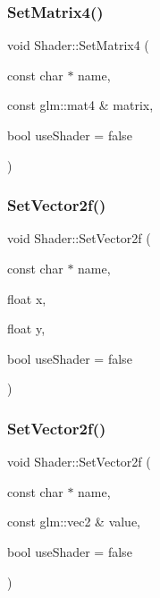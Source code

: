 \mbox{\label{classShader_a8bfcef4683f9cba1cfc955b869ee258a}} 
\subsubsection{\texorpdfstring{Set\+Matrix4()}{SetMatrix4()}}
{\footnotesize\ttfamily void Shader\+::\+Set\+Matrix4 (\begin{DoxyParamCaption}\item[{const char $\ast$}]{name,  }\item[{const glm\+::mat4 \&}]{matrix,  }\item[{bool}]{use\+Shader = {\ttfamily false} }\end{DoxyParamCaption})}

\mbox{\label{classShader_ae5994e58f1eec3278b61655ef2a23b4f}} 
\subsubsection{\texorpdfstring{Set\+Vector2f()}{SetVector2f()}\hspace{0.1cm}{\footnotesize\ttfamily [1/2]}}
{\footnotesize\ttfamily void Shader\+::\+Set\+Vector2f (\begin{DoxyParamCaption}\item[{const char $\ast$}]{name,  }\item[{float}]{x,  }\item[{float}]{y,  }\item[{bool}]{use\+Shader = {\ttfamily false} }\end{DoxyParamCaption})}

\mbox{\label{classShader_adf66248417fdee81d48fdd63bbee6805}} 
\subsubsection{\texorpdfstring{Set\+Vector2f()}{SetVector2f()}\hspace{0.1cm}{\footnotesize\ttfamily [2/2]}}
{\footnotesize\ttfamily void Shader\+::\+Set\+Vector2f (\begin{DoxyParamCaption}\item[{const char $\ast$}]{name,  }\item[{const glm\+::vec2 \&}]{value,  }\item[{bool}]{use\+Shader = {\ttfamily false} }\end{DoxyParamCaption})}

